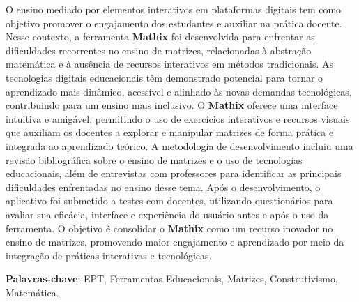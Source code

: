
\setlength{\absparsep}{18pt} %
\begin{resumo}
O ensino mediado por elementos interativos em plataformas digitais tem como objetivo promover o engajamento dos estudantes e auxiliar na prática docente. Nesse contexto, a ferramenta \textbf{Mathix} foi desenvolvida para enfrentar as dificuldades recorrentes no ensino de matrizes, relacionadas à abstração matemática e à ausência de recursos interativos em métodos tradicionais. As tecnologias digitais educacionais têm demonstrado potencial para tornar o aprendizado mais dinâmico, acessível e alinhado às novas demandas tecnológicas, contribuindo para um ensino mais inclusivo. O \textbf{Mathix} oferece uma interface intuitiva e amigável, permitindo o uso de exercícios interativos e recursos visuais que auxiliam os docentes a explorar e manipular matrizes de forma prática e integrada ao aprendizado teórico. A metodologia de desenvolvimento incluiu uma revisão bibliográfica sobre o ensino de matrizes e o uso de tecnologias educacionais, além de entrevistas com professores para identificar as principais dificuldades enfrentadas no ensino desse tema. Após o desenvolvimento, o aplicativo foi submetido a testes com docentes, utilizando questionários para avaliar sua eficácia, interface e experiência do usuário antes e após o uso da ferramenta. O objetivo é consolidar o \textbf{Mathix} como um recurso inovador no ensino de matrizes, promovendo maior engajamento e aprendizado por meio da integração de práticas interativas e tecnológicas.


 \vspace{\onelineskip}
 \noindent
 \textbf{Palavras-chave}: EPT, Ferramentas Educacionais, Matrizes, Construtivismo, Matemática.
\end{resumo}

